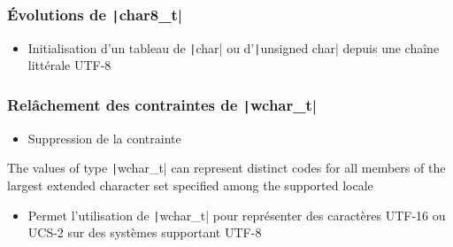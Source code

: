 \documentclass[C++.tex]{subfiles}
\begin{document}
\begin{frame}[fragile]
\end{frame}

\begin{frame}[fragile]
	\frametitle{Évolutions de \texttt|char8_t|}
	\begin{itemize}
		\item Initialisation d'un tableau de \texttt|char| ou d'\texttt|unsigned char| depuis une chaîne littérale UTF-8
	\end{itemize}

\end{frame}

\begin{frame}[fragile]
	\frametitle{Relâchement des contraintes de \texttt|wchar_t|}
	\begin{itemize}
		\item Suppression de la contrainte
	\end{itemize}

	\begin{block}{}
		The values of type \texttt|wchar_t| can represent distinct codes for all members of the largest extended character set specified among the supported locale
	\end{block}

	\begin{itemize}
		\item Permet l'utilisation de \texttt|wchar_t| pour représenter des caractères UTF-16 ou UCS-2 sur des systèmes supportant UTF-8

	\end{itemize}

\end{frame}
\end{document}
